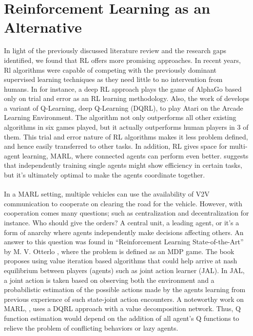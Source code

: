 \section{Reinforcement Learning as an Alternative}
\label{sec:RL_as_alternative}
In light of the previously discussed literature review and the research gaps identified, we found that RL offers more promising approaches. In recent years, Rl algorithms were capable of competing with the previously dominant supervised learning techniques as they need little to no intervention from humans. In \cite{paper10} for instance, a deep RL approach plays the game of AlphaGo based only on trial and error as an RL learning methodology. Also, the work of \cite{paper11} develops a variant of Q-Learning, deep Q-Learning (DQRL), to play Atari on the Arcade Learning Environment. The algorithm not only outperforms all other existing algorithms in six games played, but it actually outperforms human players in 3 of them. This trial and error nature of RL algorithms makes it less problem defined, and hence easily transferred to other tasks. In addition, RL gives space for multi-agent learning,  MARL, where connected agents can perform even better. \cite{paper12} suggests that independently training single agents might show efficiency in certain tasks, but it’s ultimately optimal to make the agents coordinate together. 
\\ \\ 
In a MARL setting, multiple vehicles can use the availability of V2V communication to cooperate on clearing the road for the vehicle. However,  with cooperation comes many questions; such as centralization and decentralization for instance. Who should give the orders? A central unit, a leading agent, or it’s a form of anarchy where agents independently make decisions affecting others. An answer to this question was found in “Reinforcement Learning State-of-the-Art” by M. V. Otterlo \cite{rl_state_of_the_art}, where the problem is defined as an MDP game. The book proposes using value iteration based algorithms that could help arrive at nash equilibrium between players (agents) such as joint action learner (JAL). In JAL, a joint action is taken based on observing both the environment and a probabilistic estimation of the possible actions made by the agents learning from previous experience of such state-joint action encounters. A noteworthy work on MARL, \cite{paper13}, uses a DQRL approach with a value decomposition network. Thus, Q function estimation would depend on the addition of all agent’s Q functions to relieve the problem of conflicting behaviors or lazy agents. 


